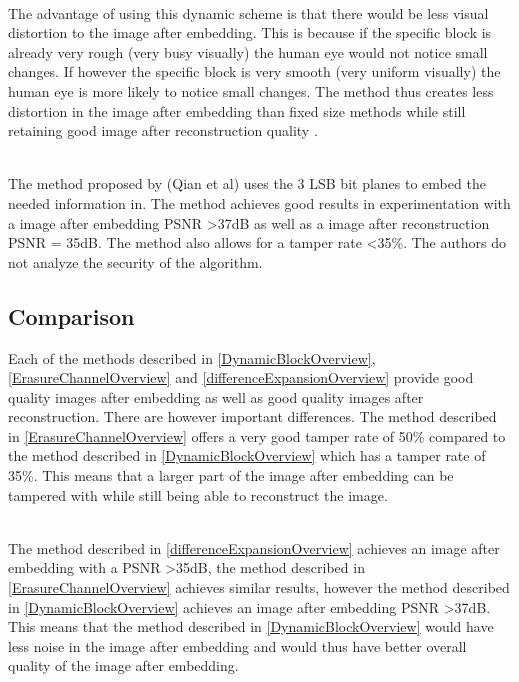 \documentclass[12pt]{article}
\begin{document}
\hspace{0pt} \\
The advantage of using this dynamic scheme is that there would be less visual distortion to the image after embedding. 
This is because if the specific block is already very rough (very busy visually) the human eye would not notice small changes.
If however the specific block is very smooth (very uniform visually) the human eye is more likely to notice small changes.
The method thus creates less distortion in the image after embedding than fixed size methods while still retaining good image after reconstruction quality \cite{qian2011image}. 

\hspace{0pt} \\
The method proposed by (Qian et al) \cite{qian2011image} uses the 3 LSB bit planes to embed the needed information in.
The method achieves good results in experimentation with a image after embedding PSNR \textgreater 37dB as well as a image after reconstruction PSNR = 35dB.
The method also allows for a tamper rate \textless 35\%.
The authors do not analyze the security of the algorithm.

\subsection{Comparison}
Each of the methods described in \ref{DynamicBlockOverview}, \ref{ErasureChannelOverview} and \ref{differenceExpansionOverview} provide good quality images after embedding as well as good quality images after reconstruction.
There are however important differences.
The method described in \ref{ErasureChannelOverview} offers a very good tamper rate of 50\% compared to the method described in \ref{DynamicBlockOverview} which has a tamper rate of 35\%.
This means that a larger part of the image after embedding can be tampered with while still being able to reconstruct the image.

\hspace{0pt} \\
The method described in \ref{differenceExpansionOverview} achieves an image after embedding with a PSNR \textgreater 35dB, the method described in \ref{ErasureChannelOverview} achieves similar results, however the method described in \ref{DynamicBlockOverview} achieves an image after embedding PSNR \textgreater 37dB.
This means that the method described in \ref{DynamicBlockOverview} would have less noise in the image after embedding and would thus have better overall quality of the image after embedding.
\end{document}
